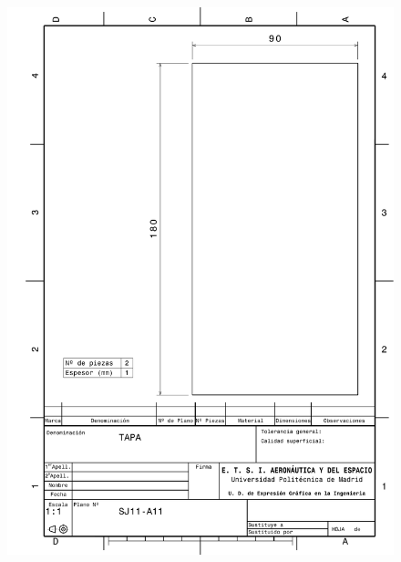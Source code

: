 \begin{figure}
    \centering
    \includegraphics[width=\linewidth]{Figures//Planos/TAP.pdf}
\end{figure}

